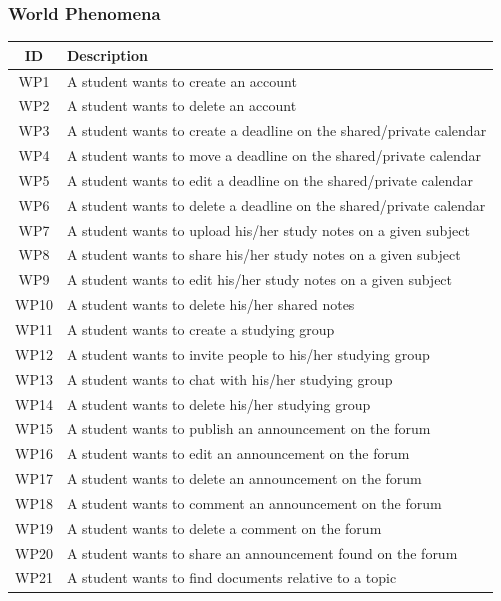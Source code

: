 \documentclass{article}
\begin{document}
\subsubsection{World Phenomena}
\begin{table}[h!]
\centering
\begin{tabular}{|c|p{10cm}|}
\hline
\textbf{ID} & \textbf{Description} \\
\hline
WP1 & A student wants to create an account \\
WP2 & A student wants to delete an account \\
WP3 & A student wants to create a deadline on the shared/private calendar \\
WP4 & A student wants to move a deadline on the shared/private calendar \\
WP5 & A student wants to edit a deadline on the shared/private calendar \\
WP6 & A student wants to delete a deadline on the shared/private calendar \\
WP7 & A student wants to upload his/her study notes on a given subject \\
WP8 & A student wants to share his/her study notes on a given subject \\
WP9 & A student wants to edit his/her study notes on a given subject \\
WP10 & A student wants to delete his/her shared notes \\
WP11 & A student wants to create a studying group \\
WP12 & A student wants to invite people to his/her studying group \\
WP13 & A student wants to chat with his/her studying group \\
WP14 & A student wants to delete his/her studying group \\
WP15 & A student wants to publish an announcement on the forum \\
WP16 & A student wants to edit an announcement on the forum \\
WP17 & A student wants to delete an announcement on the forum \\
WP18 & A student wants to comment an announcement on the forum \\
WP19 & A student wants to delete a comment on the forum \\
WP20 & A student wants to share an announcement found on the forum \\
WP21 & A student wants to find documents relative to a topic \\

\end{tabular}
\end{table}
\end{document}
